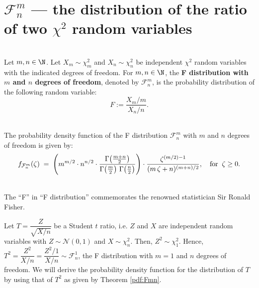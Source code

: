 \documentclass{article}
\begin{document}

\section{$\mathcal{F}^{m}_{n}$ --- the distribution of the ratio of two $\chi^{2}$ random variables}
\setcounter{theorem}{0}

\begin{definition}\mbox{}\\
Let $m,n \in \N$.  Let $X_{m} \sim \chi^{2}_{m}$ and $X_{n} \sim \chi^{2}_{n}$ be independent $\chi^{2}$ random variables with the indicated degrees of freedom.  For $m, n \in \N$, the \textbf{F distribution with $m$ and $n$ degrees of freedom}, denoted by $\mathcal{F}^{m}_{n}$, is the probability distribution of the following random variable:
\begin{equation*}
F := \dfrac{X_{m}/m}{X_{n}/n}.
\end{equation*}
\end{definition}

\begin{theorem}\label{pdf:Fmn}\mbox{}\\
The probability density function of the F distribution $\mathcal{F}^{m}_{n}$ with $m$ and $n$ degrees of freedom is given by:
\begin{equation*}
         f_{\mathcal{F}^{m}_{n}}\!\left(\zeta\right)
\; = \; \left(
         m^{m/2} \cdot n^{n/2}\cdot
         \dfrac{\Gamma\!\left(\frac{m+n}{2}\right)}{\Gamma\!\left(\frac{m}{2}\right)\,\Gamma\!\left(\frac{n}{2}\right)}
         \right)\cdot
         \dfrac{\zeta^{(m/2)-1}}{(m\,\zeta + n)^{(m+n)/2}},
\quad\textnormal{for}\;\; \zeta \geq 0.
\end{equation*}
\end{theorem}

\begin{remark}\mbox{}\\
The ``F'' in ``F distribution'' commemorates the renowned statistician Sir Ronald Fisher. \vskip 0.1cm

\noindent
Let $T = \dfrac{Z}{\sqrt{X/n}}$ be a Student $t$ ratio, i.e. $Z$ and $X$ are independent random variables with $Z \sim \mathcal{N}(0,1)$ and $X \sim \chi^{2}_{n}$.  Then, $Z^{2} \sim \chi^{2}_{1}$.  Hence, $T^{2} = \dfrac{Z^{2}}{X/n} = \dfrac{Z^{2}/1}{X/n} \sim \mathcal{F}^{1}_{n}$, the F distribution with $m=1$ and $n$ degrees of freedom.  We will derive the probability density function for the distribution of $T$ by using that of $T^{2}$ as given by Theorem \ref{pdf:Fmn}.
\end{remark}
\end{document}
